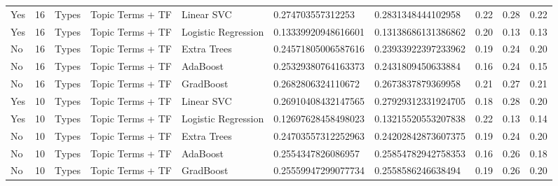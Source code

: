 \begin{table}[]
\begin{tabular}{@{}llllllllll@{}}
    Yes                 & 16              & Types                 & Topic Terms + TF      & Linear SVC          & 0.274703557312253       & 0.2831348444102958     & 0.22               & 0.28            & 0.22              \\
    Yes                 & 16              & Types                 & Topic Terms + TF      & Logistic Regression & 0.13339920948616601     & 0.13138686131386862    & 0.20               & 0.13            & 0.13              \\
    No                  & 16              & Types                 & Topic Terms + TF      & Extra Trees         & 0.24571805006587616     & 0.23933922397233962    & 0.19               & 0.24            & 0.20              \\
    No                  & 16              & Types                 & Topic Terms + TF      & AdaBoost            & 0.25329380764163373     & 0.2431809450633884     & 0.16               & 0.24            & 0.15              \\
    No                  & 16              & Types                 & Topic Terms + TF      & GradBoost           & 0.2682806324110672      & 0.2673837879369958     & 0.21               & 0.27            & 0.21              \\
    Yes                 & 10              & Types                 & Topic Terms + TF      & Linear SVC          & 0.26910408432147565     & 0.27929312331924705    & 0.18               & 0.28            & 0.20              \\
    Yes                 & 10              & Types                 & Topic Terms + TF      & Logistic Regression & 0.12697628458498023     & 0.13215520553207838    & 0.22               & 0.13            & 0.14              \\
    No                  & 10              & Types                 & Topic Terms + TF      & Extra Trees         & 0.24703557312252963     & 0.24202842873607375    & 0.19               & 0.24            & 0.20              \\
    No                  & 10              & Types                 & Topic Terms + TF      & AdaBoost            & 0.2554347826086957      & 0.25854782942758353    & 0.16               & 0.26            & 0.18              \\
    No                  & 10              & Types                 & Topic Terms + TF      & GradBoost           & 0.25559947299077734     & 0.2558586246638494     & 0.19               & 0.26            & 0.20              \\
  \end{tabular}
\end{table}
\clearpage


